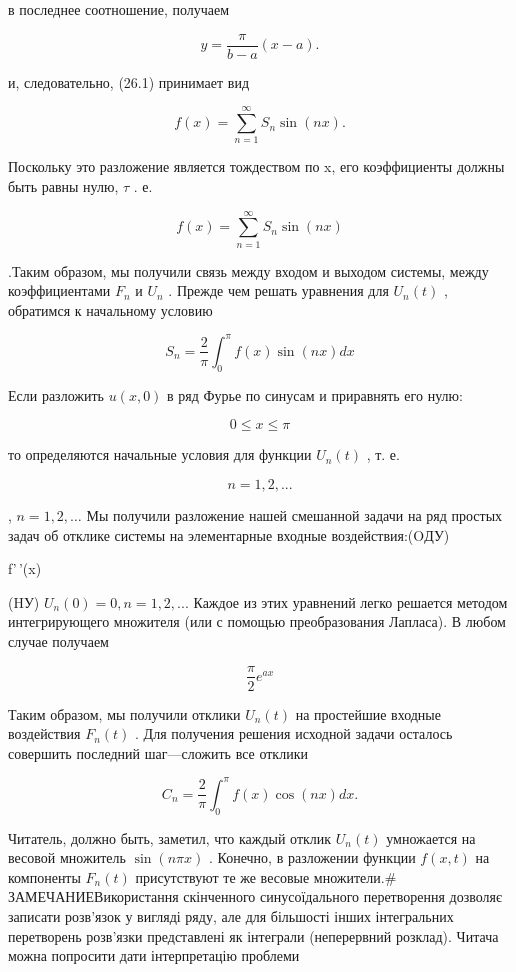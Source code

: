 \documentclass[
  ukrainian,
]{article}
\begin{document}
в последнее соотношение, получаем

\[
y = \frac{\pi}{b - a} (x - a).
\]

и, следовательно, (26.1) принимает вид

\[
f(x) = \sum_{n=1}^{\infty} S_n \sin(nx).
\]

Поскольку это разложение является тождеством по x, его коэффициенты
должны быть равны нулю, \(\tau\) . е.

\[
f(x) = \sum_{n=1}^{\infty} S_n \sin(nx)
\]

.Таким образом, мы получили связь между входом и выходом системы, между
коэффициентами \(F_n\) и \(U_n\) . Прежде чем решать уравнения для
\(U_n(t)\) , обратимся к начальному условию

\[
S_n = \frac{2}{\pi} \int_{0}^{\pi} f(x) \sin(nx) dx
\]

Если разложить \(u(x, 0)\) в ряд Фурье по синусам и приравнять его нулю:

\[
0 \le x \le \pi
\]

то определяются начальные условия для функции \(U_n\left(t\right)\) , т.
е.

\[
n = 1, 2, ...
\]

, \(n = 1, 2, \dots\) Мы получили разложение нашей смешанной задачи на
ряд простых задач об отклике системы на элементарные входные
воздействия:(OДУ)

f'\,'(x)

(HУ) \(U_n(0) = 0, n = 1, 2, ...\) Каждое из этих уравнений легко
решается методом интегрирующего множителя (или с помощью преобразования
Лапласа). В любом случае получаем

\[
\frac{\pi}{2} e^{ax}
\]

Таким образом, мы получили отклики \(U_n(t)\) на простейшие входные
воздействия \(F_n(t)\) . Для получения решения исходной задачи осталось
совершить последний шаг---сложить все отклики

\[
C_n = \frac{2}{\pi} \int_0^{\pi} f(x) \cos(nx) dx.
\]

Читатель, должно быть, заметил, что каждый отклик \(U_n(t)\) умножается
на весовой множитель \(\sin(n\pi x)\) . Конечно, в разложении функции
\(f(x, t)\) на компоненты \(F_n(t)\) присутствуют те же весовые
множители.\# ЗАМЕЧАНИЕВикористання скінченного синусоїдального
перетворення дозволяє записати розв'язок у вигляді ряду, але для
більшості інших інтегральних перетворень розв'язки представлені як
інтеграли (неперервний розклад). Читача можна попросити дати
інтерпретацію проблеми
\end{document}
